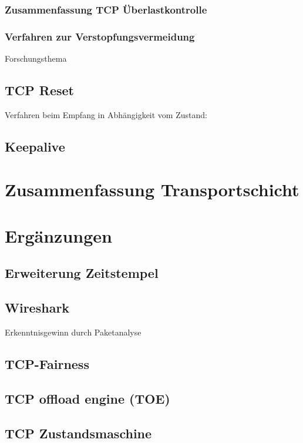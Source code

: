 \subsubsection{Zusammenfassung TCP Überlastkontrolle}
\subsubsection{Verfahren zur Verstopfungsvermeidung}
Forschungsthema

\subsection{TCP Reset}
Verfahren beim Empfang in Abhängigkeit vom Zustand:

\subsection{Keepalive}

\section{Zusammenfassung Transportschicht}

\section{Ergänzungen}
\subsection{Erweiterung Zeitstempel}
\subsection{Wireshark}
Erkenntnisgewinn durch Paketanalyse
\subsection{TCP-Fairness}
\subsection{TCP offload engine (TOE)}
\subsection{TCP Zustandsmaschine}
